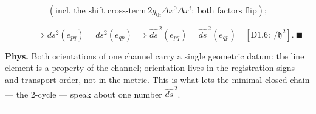 \begin{theorem}
\[
(\text{incl. the shift cross-term}\ 2g_{0i}\Delta x^0\Delta x^i:\ \text{both factors flip});
\]

\[
\qquad \implies ds^2(e_{pq})=ds^2(e_{qp})\implies\widehat{ds}^{\,2}(e_{pq})=\widehat{ds}^{\,2}(e_{qp})\quad[\mathrm{D1.6}:\ /\mathfrak h^2].\ \blacksquare
\]

\textbf{Phys.} Both orientations of one channel carry a single geometric datum: the line element is a property of the channel; orientation lives in the registration signs and transport order, not in the metric. This is what lets the minimal closed chain — the 2-cycle — speak about one number $\widehat{ds}^{\,2}$.

\vspace{2pt}\noindent\rule{\textwidth}{0.4pt}\vspace{2pt}

\end{theorem}

